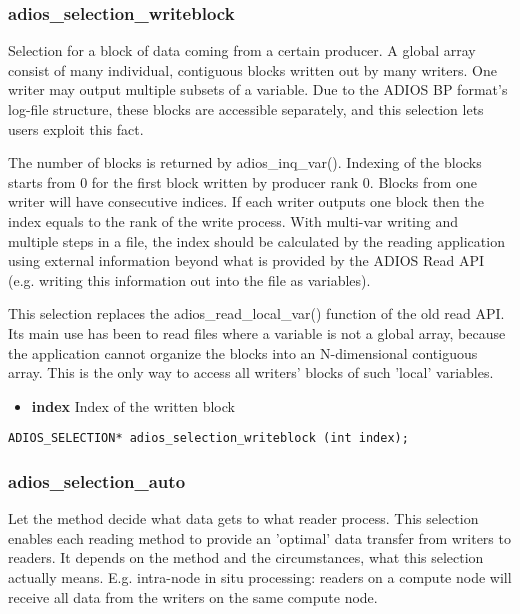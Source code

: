 \subsubsection{adios\_selection\_writeblock}
Selection for a block of data coming from a certain producer.
A global array consist of many individual, contiguous blocks written out by
many writers. One writer may output multiple subsets of a variable. 
Due to the ADIOS BP format's log-file structure, these blocks are accessible 
separately, and this selection lets users exploit this fact. 

The number of blocks is returned by adios\_inq\_var(). 
Indexing of the blocks starts from 0 for the first block
written by producer rank 0. Blocks from one writer will have consecutive indices. 
If each writer outputs one block then the index equals to the rank of the write process. 
With multi-var writing and multiple steps in a file, the index should be
calculated by the reading application using external information beyond
what is provided by the ADIOS Read API 
(e.g. writing this information out into the file as variables).

This selection replaces the adios\_read\_local\_var() function of the old read API. 
Its main use has been to read files where a variable is not a global array, because 
the application cannot organize the blocks into an N-dimensional contiguous array. 
This is the only way to access all writers' blocks of such 'local' variables.

\begin{itemize} 
\item{\bf index}    Index of the written block
\end{itemize}

\begin{lstlisting}[alsolanguage=C]
ADIOS_SELECTION* adios_selection_writeblock (int index);
\end{lstlisting}


\subsubsection{adios\_selection\_auto}
Let the method decide what data gets to what reader process.
This selection enables each reading method to provide an 'optimal'
data transfer from writers to readers. It depends on the method and the 
circumstances, what this selection actually means.
E.g. intra-node in situ processing: readers on a compute node will receive all data 
from the writers on the same compute node.

